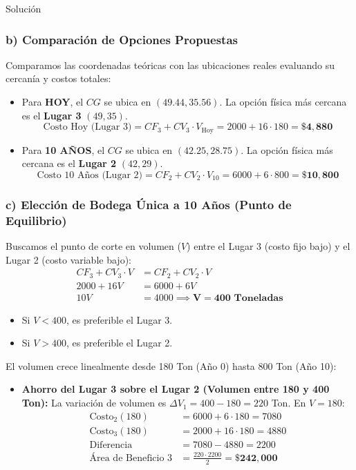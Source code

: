 \documentclass[11pt, a4paper]{article}
\begin{document}
\begin{ejercicio}{Solución}
  \subsubsection*{b) Comparación de Opciones Propuestas}
  Comparamos las coordenadas teóricas con las ubicaciones reales evaluando su cercanía y costos totales:
  \begin{itemize}
    \item Para \textbf{HOY}, el $CG$ se ubica en $(49.44, 35.56)$. La opción física más cercana es el \textbf{Lugar 3} $(49, 35)$.
    \begin{equation*}
      \text{Costo Hoy (Lugar 3)} = CF_3 + CV_3 \cdot V_{\text{Hoy}} = 2000 + 16 \cdot 180 = \mathbf{\$4,880}
    \end{equation*}
    \item Para \textbf{10 AÑOS}, el $CG$ se ubica en $(42.25, 28.75)$. La opción física más cercana es el \textbf{Lugar 2} $(42, 29)$.
    \begin{equation*}
      \text{Costo 10 Años (Lugar 2)} = CF_2 + CV_2 \cdot V_{10} = 6000 + 6 \cdot 800 = \mathbf{\$10,800}
    \end{equation*}
  \end{itemize}

  \subsubsection*{c) Elección de Bodega Única a 10 Años (Punto de Equilibrio)}
  Buscamos el punto de corte en volumen ($V$) entre el Lugar 3 (costo fijo bajo) y el Lugar 2 (costo variable bajo):
  \begin{align*}
    CF_3 + CV_3 \cdot V &= CF_2 + CV_2 \cdot V \\
    2000 + 16 V &= 6000 + 6 V \\
    10 V &= 4000 \implies \mathbf{V = 400 \text{ Toneladas}}
  \end{align*}

  \begin{itemize}
    \item Si $V < 400$, es preferible el Lugar 3.
    \item Si $V > 400$, es preferible el Lugar 2.
  \end{itemize}

  El volumen crece linealmente desde 180 Ton (Año 0) hasta 800 Ton (Año 10):
  \begin{itemize}
    \item \textbf{Ahorro del Lugar 3 sobre el Lugar 2 (Volumen entre 180 y 400 Ton):}
    La variación de volumen es $\Delta V_1 = 400 - 180 = 220$ Ton.
    En $V=180$:
    \begin{align*}
      \text{Costo}_2(180) &= 6000 + 6 \cdot 180 = 7080 \\
      \text{Costo}_3(180) &= 2000 + 16 \cdot 180 = 4880 \\
      \text{Diferencia} &= 7080 - 4880 = 2200 \\
      \text{Área de Beneficio 3} &= \frac{220 \cdot 2200}{2} = \mathbf{\$242,000}
    \end{align*}


\end{itemize}
\end{ejercicio}
\end{document}
